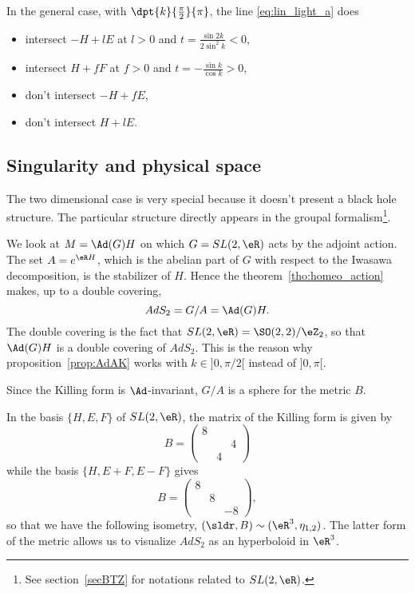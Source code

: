 In the general case, with $\dpt{k}{\frac{\pi}{2}}{\pi}$, the line \eqref{eq:lin_light_a} does

\begin{itemize}
\item intersect $-H+lE$ at $l>0$ and $t=\frac{\sin 2k}{2\sin^2k}<0$,
\item intersect $H+fF$ at $f>0$ and $t=-\frac{\sin k}{\cos k}>0$,
\item don't intersect $-H+fE$,
\item don't intersect $H+lE$.
\end{itemize}


\subsection{Singularity and physical space}

The two dimensional case is very special because it doesn't present a black hole structure. The particular structure directly appears in the groupal formalism\footnote{See section~\ref{secBTZ} for notations related to $SL(2,\eR)$.}.

We look at $M=\Ad(G)H$ on which $G=SL(2,\eR)$ acts by the adjoint action. The set $A=e^{\eR H}$, which is the abelian part of $G$ with respect to the Iwasawa decomposition, is the stabilizer of $H$. Hence the theorem~\ref{tho:homeo_action} makes, up to a double covering,
\begin{equation}
AdS_2=G/A=\Ad(G)H.
\end{equation}
The double covering is the fact that $SL(2,\eR)=\SO(2,2)/\eZ_2$, so that $\Ad(G)H$ is a double covering of $AdS_2$. This is the reason why proposition~\ref{prop:AdAK} works with $k\in]0,\pi/2[$ instead of $]0,\pi[$.

Since the Killing form is $\Ad$-invariant, $G/A$ is a sphere for the metric $B$.

 In the basis $\{H,E,F\}$ of $SL(2,\eR)$, the matrix of the Killing form is given by
\begin{equation}
B=
\begin{pmatrix}
8&&\\
&&4\\
&4&
\end{pmatrix}
\end{equation}
while the basis  $\{H,E+F,E-F\}$ gives
\[
B=
\begin{pmatrix}
8\\
&8\\
&&-8
\end{pmatrix},
\]
so that we have the following isometry, $(\sldr,B)\sim(\eR^3,\eta_{1,2})$. The latter form of the metric allows us to visualize $AdS_2$ as an hyperboloid in $\eR^3$.

